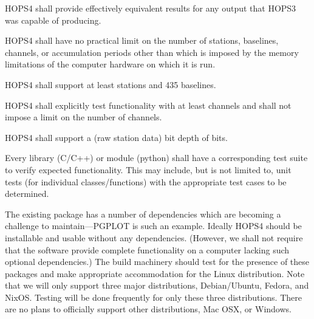 \begin{description}

 HOPS4 shall provide effectively equivalent results for any output that HOPS3 was capable of producing.

 HOPS4 shall have no practical limit on the number of stations,
baselines, channels, or accumulation periods other than which is imposed by the
memory limitations of the computer hardware on which it is run.


 HOPS4 shall support at least \FIX[30] stations and 435 baselines.

 HOPS4 shall explicitly test functionality with at least \FIX[128] 
channels and shall not impose a limit on the number of channels.

 HOPS4 shall support a (raw station data) bit depth of \FIX[2] bits.

 Every library (C/C++) or module (python) shall have a corresponding
test suite to verify expected functionality. This may include, but is not limited
to, unit tests (for individual classes/functions) with the appropriate test
cases to be determined.


\end{description}

The existing package has a number of dependencies which are becoming
a challenge to maintain---\acs{PGPLOT} is such an example.  Ideally
HOPS4 should be installable and usable without any dependencies.
(However, we shall not require that the software provide complete functionality
on a computer lacking such optional dependencies.) The build machinery should test
for the presence of these packages and make appropriate accommodation for
the Linux distribution. Note that we will only support three major distributions,
Debian/Ubuntu, Fedora, and NixOS. Testing will be done frequently for only these
three distributions. There are no plans to officially support other distributions,
Mac OSX, or Windows.

